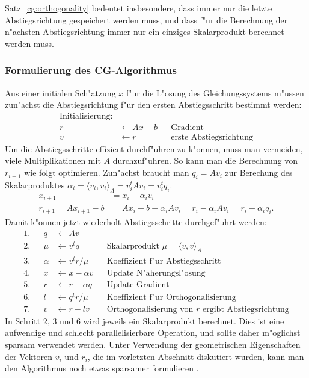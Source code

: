 Satz~\ref{cg:orthogonality}
bedeutet insbesondere, dass immer nur die letzte Abstiegsrichtung
gespeichert werden muss, und dass f"ur die Berechnung der n"achsten
Abstiegsrichtung immer nur ein einziges Skalarprodukt berechnet werden
muss.

\subsubsection{Formulierung des CG-Algorithmus}
Aus einer initialen Sch"atzung $x$ f"ur die L"osung des Gleichungssystems
m"ussen zun"achst die Abstiegsrichtung f"ur den ersten Abstiegsschritt
bestimmt werden:
\begin{align*}
\text{Initialisierung:}&&&\\
r&\leftarrow Ax - b&&\text{Gradient}\\
v&\leftarrow r     &&\text{erste Abstiegsrichtung}
\end{align*}
Um die Abstiegsschritte effizient durchf"uhren zu k"onnen, muss man
vermeiden, viele Multiplikationen mit $A$ durchzuf"uhren.
So kann man die Berechnung von $r_{i+1}$ wie folgt optimieren. 
Zun"achst braucht man $q_i=Av_i$ zur Berechung des Skalarproduktes
$\alpha_i = \langle v_i,v_i\rangle_A=v_i^tAv_i=v_i^tq_i$. 
\begin{align*}
           x_{i+1}&=x_i-\alpha_i v_i\\
r_{i+1}=Ax_{i+1}-b&=Ax_i-b-\alpha_i Av_i=r_i-\alpha_i Av_i = r_i-\alpha_i q_i.
\end{align*}
Damit k"onnen jetzt wiederholt Abstiegsschritte durchgef"uhrt werden:
\begin{align*}
1.&&     q&\leftarrow Av            &&\\
2.&&   \mu&\leftarrow v^t q         &&\text{Skalarprodukt
                                            $\mu=\langle v,v\rangle_A$}\\
3.&&\alpha&\leftarrow v^t r/\mu     &&\text{Koeffizient f"ur Abstiegsschritt}\\
4.&&     x&\leftarrow x-\alpha v    &&\text{Update N"aherungsl"osung}\\
5.&&     r&\leftarrow r-\alpha q    &&\text{Update Gradient}\\
6.&&     l&\leftarrow q^tr/\mu      &&\text{Koeffizient f"ur
                                            Orthogonalisierung}\\
7.&&     v&\leftarrow r - l v       &&\text{Orthogonalisierung von $r$ ergibt
                                            Abstiegsrichtung}
\end{align*}
In Schritt 2, 3 und 6 wird jeweils ein Skalarprodukt berechnet.
Dies ist eine aufwendige und schlecht parallelisierbare Operation,
und sollte daher m"oglichst sparsam verwendet werden.
Unter Verwendung der geometrischen Eigenschaften der Vektoren $v_i$ und
$r_i$, die im vorletzten Abschnitt diskutiert wurden, kann man den
Algorithmus noch etwas sparsamer formulieren \cite[Chapter 8.7]{skript:watkins}.


